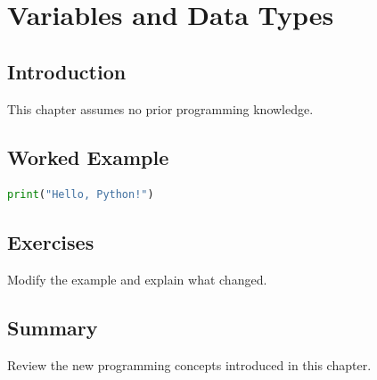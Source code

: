 \chapter{Variables and Data Types}
\label{chap:vol3-3}



\section{Introduction}
This chapter assumes no prior programming knowledge.

\section{Worked Example}
\begin{lstlisting}[language=Python]
print("Hello, Python!")
\end{lstlisting}

\section{Exercises}
\begin{exercise}
Modify the example and explain what changed.
\end{exercise}

\section{Summary}
Review the new programming concepts introduced in this chapter.
